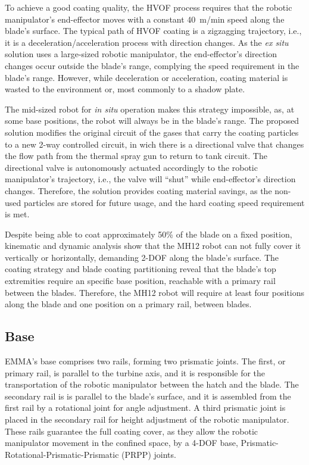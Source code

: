 To achieve a good coating quality, the HVOF process requires that the robotic
manipulator's end-effector moves with a constant 40~m/min speed along the
blade's surface. The typical path of HVOF coating is a zigzagging trajectory,
i.e., it is a deceleration/acceleration process with direction changes. As the
\textit{ex situ} solution uses a large-sized robotic manipulator, the
end-effector's direction changes occur outside the blade's range, complying the
speed requirement in the blade's range. However, while deceleration or
acceleration, coating material is wasted to the environment or, most commonly
to a shadow plate.

The mid-sized robot for \textit{in situ} operation makes this strategy
impossible, as, at some base positions, the robot will always be in the blade's
range. The proposed solution modifies the original circuit of the gases that
carry the coating particles to a new 2-way controlled circuit, in wich there is a directional
valve that changes the flow path from the thermal spray gun to return to tank
circuit. %
The directional valve is autonomously actuated accordingly to the robotic
manipulator's trajectory, i.e., the valve will ``shut'' while end-effector's
direction changes. Therefore, the solution provides coating material savings,
as the non-used particles are stored for future usage, and the hard coating
speed requirement is met.

Despite being able to coat approximately 50\% of the blade on a fixed
position, kinematic and dynamic analysis show that the MH12 robot can not fully
cover it vertically or horizontally, demanding 2-DOF along the blade's surface.
The coating strategy and blade coating partitioning reveal that the blade's top
extremities require an specific base position, reachable
with a primary rail between the blades. Therefore, the MH12 robot will require
at least four positions along the blade and one position on a primary
rail, between blades. 

\subsection{Base}

EMMA's base comprises two rails, forming two prismatic joints. The
first, or primary rail, is parallel to the turbine axis, and it is responsible
for the transportation of the robotic manipulator between the hatch and the
blade. The secondary rail is is parallel to the blade's surface, and it is
assembled from the first rail by a rotational joint for angle adjustment. A
third prismatic joint is placed in the secondary rail for height adjustment of
the robotic manipulator. These rails guarantee the full coating cover, as they
allow the robotic manipulator movement in the confined space, by a 4-DOF
base, Prismatic-Rotational-Prismatic-Prismatic (PRPP) joints. %

